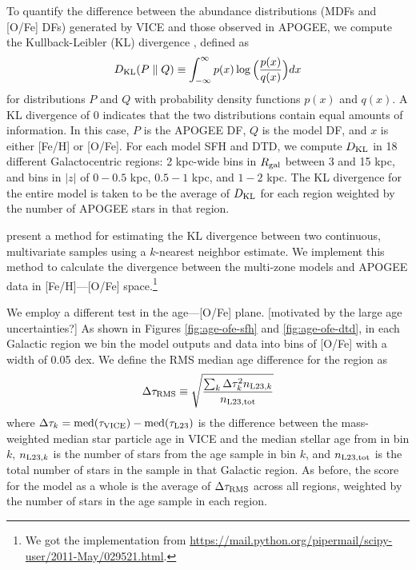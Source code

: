 \documentclass[twocolumn,twocolappendix,linenumbers,trackchanges]{aastex631}
\begin{document}
To quantify the difference between the abundance distributions (MDFs and [O/Fe] DFs) generated by VICE and those observed in APOGEE, we compute the Kullback-Leibler (KL) divergence \citep{KullbackLeibler1951}, defined as
\begin{equation}
    D_{\rm{KL}}(P \parallel Q) \equiv \int_{-\infty}^{\infty} p(x) \log\Big(\frac{p(x)}{q(x)}\Big) dx
    \label{eq:kl-divergence}
\end{equation}
for distributions $P$ and $Q$ with probability density functions $p(x)$ and $q(x)$. A KL divergence of 0 indicates that the two distributions contain equal amounts of information. In this case, $P$ is the APOGEE DF, $Q$ is the model DF, and $x$ is either [Fe/H] or [O/Fe]. For each model SFH and DTD, we compute $D_{\rm{KL}}$ in 18 different Galactocentric regions: 2 kpc-wide bins in $R_{\rm gal}$ between 3 and 15 kpc, and bins in $|z|$ of $0-0.5$ kpc, $0.5-1$ kpc, and $1-2$ kpc. The KL divergence for the entire model is taken to be the average of $D_{\rm{KL}}$ for each region weighted by the number of APOGEE stars in that region.

\citet{PerezCruz2008-KLTest2D} present a method for estimating the KL divergence between two continuous, multivariate samples using a $k$-nearest neighbor estimate. We implement this method to calculate the divergence between the multi-zone models and APOGEE data in [Fe/H]---[O/Fe] space.\footnote{We got the implementation from \url{https://mail.python.org/pipermail/scipy-user/2011-May/029521.html}.}

We employ a different test in the age---[O/Fe] plane. [motivated by the large age uncertainties?] As shown in Figures \ref{fig:age-ofe-sfh} and \ref{fig:age-ofe-dtd}, in each Galactic region we bin the model outputs and data into bins of [O/Fe] with a width of 0.05 dex. We define the RMS median age difference for the region as
\begin{equation}
    \Delta\tau_{\rm RMS} \equiv \sqrt{\frac{\sum_k \Delta\tau_k^2 n_{{\rm L23},k}}{n_{\rm L23,tot}}}
    \label{eq:age-ofe-score}
\end{equation}
where $\Delta\tau_k=\rm{med}(\tau_{\rm VICE})-\rm{med}(\tau_{\rm L23})$ is the difference between the mass-weighted median star particle age in VICE and the median stellar age from \citet{Leung2023-Ages} in bin $k$, $n_{{\rm L23},k}$ is the number of stars from the \citet{Leung2023-Ages} age sample in bin $k$, and $n_{\rm L23,tot}$ is the total number of stars in the sample in that Galactic region. As before, the score for the model as a whole is the average of $\Delta \tau_{\rm RMS}$ across all regions, weighted by the number of stars in the age sample in each region.
\end{document}
